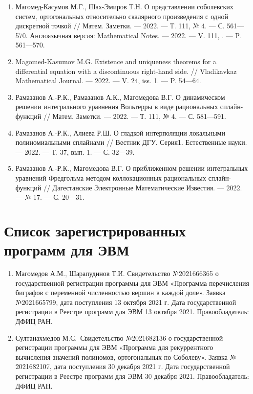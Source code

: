 \begin{enumerate}[1]

    \item
    Магомед-Касумов М.Г., Шах-Эмиров Т.Н.
    О представлении соболевских систем, ортогональных относительно скалярного произведения с одной дискретной точкой
    //
    Матем. Заметки.
    --- 2022.
    --- Т. 111, № 4.
    --- С. 561---570. 
    Англоязычная версия:
    Mathematical Notes. 
    --- 2022.
    --- V. 111, .
    --- P. 561---570.
    
    \item
    Magomed-Kasumov M.G.
    Existence and uniqueness theorems for a differential equation with a discontinuous right-hand side.
    //
    Vladikavkaz Mathematical Journal.
    --- 2022.
    --- V. 24, iss. 1.
    --- P. 54---64.


    
    \item
    Рамазанов А.-Р.К., Рамазанов А.К., Магомедова В.Г.
    О динамическом решении интегрального уравнения Вольтерры в виде рациональных сплайн-функций
    //
    Матем. Заметки.
    --- 2022.
    --- Т. 111, № 4.
    --- С. 581---591. 
    
    \item
    Рамазанов А.-Р.К., Алиева Р.Ш.
    О гладкой интерполяции локальными полиномиальными сплайнами
    //
    Вестник ДГУ. Серия1. Естественные науки.
    --- 2022.
    --- Т. 37, вып. 1.
    --- С. 32---39.
    
    \item
    Рамазанов А.-Р.К., Магомедова В.Г.
    О приближенном решении интегральных уравнений Фредгольма методом коллокационных рациональных сплайн-функций
    //
    Дагестанские Электронные Математические Известия.
    --- 2022.
    --- № 17.
    --- С. 20---31.

\end{enumerate}

\section*{Список зарегистрированных программ для ЭВМ}

\begin{enumerate}[1]
    \item
    Магомедов А.М., Шарапудинов Т.И. Свидетельство №2021666365 о государственной регистрации программы для ЭВМ «Программа перечисления биграфов с переменной численностью вершин в каждой доле». Заявка №2021665799, дата поступления 13 октября 2021 г. Дата государственной регистрации в Реестре программ для ЭВМ 13 октября 2021. Правообладатель: ДФИЦ РАН.
    
    \item
    Султанахмедов М.С.~Свидетельство №2021682136 о государственной регистрации программы для ЭВМ «Программа для рекуррентного вычисления значений полиномов, ортогональных по Соболеву». Заявка № 2021682107, дата поступления 30 декабря 2021 г. Дата государственной регистрации в Реестре программ для ЭВМ 30 декабря 2021. Правообладатель: ДФИЦ РАН.
\end{enumerate}
